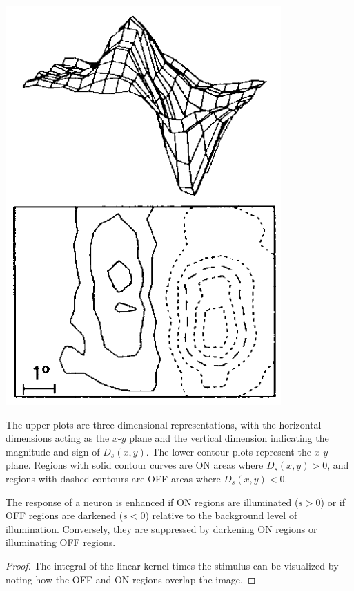 \begin{exm}
\begin{center}
    \includegraphics[scale=0.3]{./png/spatialExm2}
  \end{center}
  The upper plots are three-dimensional representations, with the horizontal dimensions acting as the $x$-$y$ plane and the vertical dimension indicating the magnitude and sign of $D_s(x, y)$. The lower contour plots represent the $x$-$y$ plane. Regions with solid contour curves are ON areas where $D_s(x, y) > 0$, and regions with dashed contours are OFF areas where $D_s(x, y) < 0$.
\end{exm}

\begin{prop}
  \label{prop:OnOffEffect}
  The response of a neuron is enhanced if ON regions are illuminated ($s>0$) or if OFF regions are darkened ($s<0$) relative to the background level of illumination. Conversely, they are suppressed by darkening ON regions or illuminating OFF regions.
\end{prop}
\begin{proof}
  The integral of the linear kernel times the stimulus can be visualized by noting how the OFF and ON regions overlap the image.
\end{proof}

